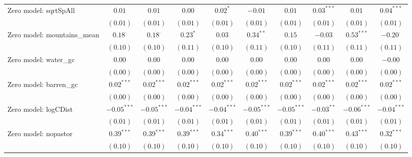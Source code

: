 \begin{center}
\begin{longtable}{l c c c c c c c c c}
Zero model: sqrtSpAll          & $0.01$         & $0.01$         & $0.00$        & $0.02^{*}$    & $-0.01$       & $0.01$          & $0.03^{***}$  & $0.01$        & $0.04^{***}$    \\
                               & $(0.01)$       & $(0.01)$       & $(0.01)$      & $(0.01)$      & $(0.01)$      & $(0.01)$        & $(0.01)$      & $(0.01)$      & $(0.01)$        \\
Zero model: mountains\_mean    & $0.18^{\cdot}$ & $0.18^{\cdot}$ & $0.23^{*}$    & $0.03$        & $0.34^{**}$   & $0.15$          & $-0.03$       & $0.53^{***}$  & $-0.20^{\cdot}$ \\
                               & $(0.10)$       & $(0.10)$       & $(0.11)$      & $(0.10)$      & $(0.11)$      & $(0.10)$        & $(0.11)$      & $(0.11)$      & $(0.11)$        \\
Zero model: water\_gc          & $0.00$         & $0.00$         & $0.00$        & $0.00$        & $0.00$        & $0.00$          & $0.00$        & $0.00$        & $-0.00$         \\
                               & $(0.00)$       & $(0.00)$       & $(0.00)$      & $(0.00)$      & $(0.00)$      & $(0.00)$        & $(0.00)$      & $(0.00)$      & $(0.00)$        \\
Zero model: barren\_gc         & $0.02^{***}$   & $0.02^{***}$   & $0.02^{***}$  & $0.02^{***}$  & $0.02^{***}$  & $0.02^{***}$    & $0.02^{***}$  & $0.02^{***}$  & $0.02^{***}$    \\
                               & $(0.00)$       & $(0.00)$       & $(0.00)$      & $(0.00)$      & $(0.00)$      & $(0.00)$        & $(0.00)$      & $(0.00)$      & $(0.00)$        \\
Zero model: logCDist           & $-0.05^{***}$  & $-0.05^{***}$  & $-0.04^{***}$ & $-0.04^{***}$ & $-0.05^{***}$ & $-0.05^{***}$   & $-0.03^{**}$  & $-0.06^{***}$ & $-0.04^{***}$   \\
                               & $(0.01)$       & $(0.01)$       & $(0.01)$      & $(0.01)$      & $(0.01)$      & $(0.01)$        & $(0.01)$      & $(0.01)$      & $(0.01)$        \\
Zero model: nopastor           & $0.39^{***}$   & $0.39^{***}$   & $0.39^{***}$  & $0.34^{***}$  & $0.40^{***}$  & $0.39^{***}$    & $0.40^{***}$  & $0.43^{***}$  & $0.32^{***}$    \\
                               & $(0.10)$       & $(0.10)$       & $(0.10)$      & $(0.10)$      & $(0.10)$      & $(0.10)$        & $(0.10)$      & $(0.10)$      & $(0.10)$        \\

\end{longtable}
\end{center}

